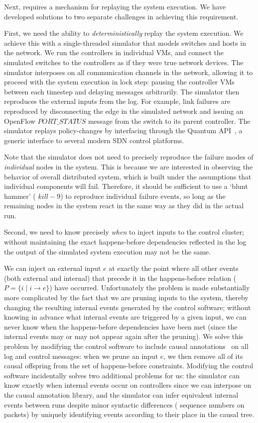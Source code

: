 Next, \simulator{} requires a mechanism for replaying the system execution.
We have developed
solutions to two separate challenges in achieving this requirement.

First, we need the ability to {\em deterministically} replay the system
execution. We achieve this with a single-threaded simulator that models switches
and hosts in the network. We run the controllers in individual VMs, and
connect the simulated switches to the controllers as if they were true
network devices. The simulator interposes on all communication channels in
the network, allowing it to proceed with the system execution in lock step:
pausing the controller VMs between each timestep and delaying messages
arbitrarily. The simulator then reproduces the external inputs from the log.
For example, link failures are reproduced by disconnecting the edge in
the simulated network and issuing an
OpenFlow $PORT\_STATUS$ message from the switch to its parent controller. The simulator replays policy-changes by
interfacing through the Quantum API~\cite{quantum}, a generic interface
to several modern SDN control platforms.

Note that the simulator does not need
to precisely reproduce the failure modes of {\em individual} nodes in the system. This is because
we are interested in observing the behavior of overall distributed system, which is
built under the assumptions that individual components will fail.
Therefore, it should be sufficient to use a `blunt hammer' (\eg{}
$kill -9$) to reproduce individual
failure events, so long as the remaining nodes in the system react in the same
way as they did in the actual run.

Second, we need to know precisely {\em when} to inject inputs to the control
cluster; without maintaining the exact happens-before dependencies reflected in the
log the output of the simulated system execution may not be the same.

We can inject an external input $e$ at exactly the point where all other
events (both external and internal) that precede it in the happens-before
relation ($P = \{i \mid i \rightarrow e\}$) have occurred. Unfortunately the problem is made
substantially more complicated by the fact that we are pruning inputs to the
system, thereby changing the resulting internal events generated by the control
software; without knowing in advance what internal events are triggered by a
given input, we can never know when the happens-before dependencies have
been met (since the internal events may or may not appear again after the
pruning). We solve this problem by modifying the control software to include causal
annotations~\cite{xtrace} on all log and control messages:
when we prune an input $e$, we then remove all of its causal offspring from the set of
happens-before constraints. Modifying the control software incidentally solves two
additional problems for us: the simulator can know exactly when internal events occur
on controllers since we can interpose on the causal annotation library, and
the simulator can infer equivalent internal events between runs despite minor
syntactic differences (\eg{} sequence numbers on packets) by
uniquely identifying events according to their place in the causal tree.

